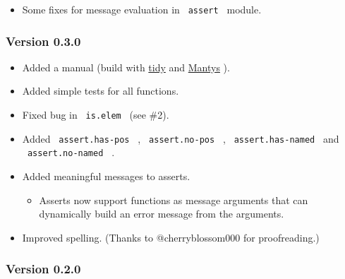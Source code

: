 \begin{itemize}
\tightlist
\item
  Some fixes for message evaluation in \texttt{\ assert\ } module.
\end{itemize}

\subsubsection{Version 0.3.0}\label{version-0.3.0}

\begin{itemize}
\tightlist
\item
  Added a manual (build with \href{https://github.com/Mc-Zen/tidy}{tidy}
  and \href{https://github.com/jneug/typst-mantys}{Mantys} ).
\item
  Added simple tests for all functions.
\item
  Fixed bug in \texttt{\ is.elem\ } (see \#2).
\item
  Added \texttt{\ assert.has-pos\ } , \texttt{\ assert.no-pos\ } ,
  \texttt{\ assert.has-named\ } and \texttt{\ assert.no-named\ } .
\item
  Added meaningful messages to asserts.

  \begin{itemize}
  \tightlist
  \item
    Asserts now support functions as message arguments that can
    dynamically build an error message from the arguments.
  \end{itemize}
\item
  Improved spelling. (Thanks to @cherryblossom000 for proofreading.)
\end{itemize}

\subsubsection{Version 0.2.0}\label{version-0.2.0}

